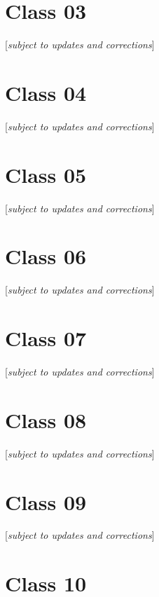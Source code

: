 \documentclass[
]{book}
\begin{document}
\hypertarget{class-03}{%
\chapter{Class 03}\label{class-03}}

{[}\emph{subject to updates and corrections}{]}

\hypertarget{class-04}{%
\chapter{Class 04}\label{class-04}}

{[}\emph{subject to updates and corrections}{]}

\hypertarget{class-05}{%
\chapter{Class 05}\label{class-05}}

{[}\emph{subject to updates and corrections}{]}

\hypertarget{class-06}{%
\chapter{Class 06}\label{class-06}}

{[}\emph{subject to updates and corrections}{]}

\hypertarget{class-07}{%
\chapter{Class 07}\label{class-07}}

{[}\emph{subject to updates and corrections}{]}

\hypertarget{class-08}{%
\chapter{Class 08}\label{class-08}}

{[}\emph{subject to updates and corrections}{]}

\hypertarget{class-09}{%
\chapter{Class 09}\label{class-09}}

{[}\emph{subject to updates and corrections}{]}

\hypertarget{class-10}{%
\chapter{Class 10}\label{class-10}}
\end{document}
